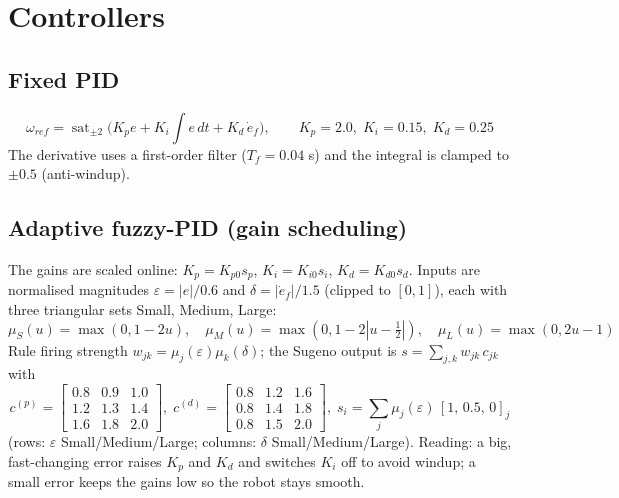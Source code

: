 \documentclass[11pt,a4paper]{article}
\newcommand{\dd}[1]{\dot{#1}}
\begin{document}
\section{Controllers}
\subsection{Fixed PID}
\begin{equation}
\omega_{ref}=\operatorname{sat}_{\pm2}\!\Big(K_p e+K_i\!\int e\,dt+K_d\,\dd e_f\Big),\qquad K_p=2.0,\;K_i=0.15,\;K_d=0.25
\end{equation}
The derivative uses a first-order filter ($T_f=0.04$ s) and the integral is clamped to $\pm0.5$ (anti-windup).

\subsection{Adaptive fuzzy-PID (gain scheduling)}
The gains are scaled online: $K_p=K_{p0}s_p$, $K_i=K_{i0}s_i$, $K_d=K_{d0}s_d$. Inputs are normalised magnitudes $\varepsilon=|e|/0.6$ and $\delta=|\dd e_f|/1.5$ (clipped to $[0,1]$), each with three triangular sets Small, Medium, Large:
\begin{equation}
\mu_S(u)=\max(0,1-2u),\quad \mu_M(u)=\max(0,1-2|u-\tfrac12|),\quad \mu_L(u)=\max(0,2u-1)
\end{equation}
Rule firing strength $w_{jk}=\mu_j(\varepsilon)\mu_k(\delta)$; the Sugeno output is $s=\sum_{j,k}w_{jk}\,c_{jk}$ with
\begin{equation}
c^{(p)}=\begin{bmatrix}0.8&0.9&1.0\\1.2&1.3&1.4\\1.6&1.8&2.0\end{bmatrix},\;
c^{(d)}=\begin{bmatrix}0.8&1.2&1.6\\0.8&1.4&1.8\\0.8&1.5&2.0\end{bmatrix},\;
s_i=\sum_j\mu_j(\varepsilon)\,[1,\,0.5,\,0]_j
\end{equation}
(rows: $\varepsilon$ Small/Medium/Large; columns: $\delta$ Small/Medium/Large). Reading: a big, fast-changing error raises $K_p$ and $K_d$ and switches $K_i$ off to avoid windup; a small error keeps the gains low so the robot stays smooth.
\end{document}
